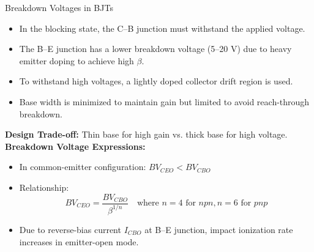 
\begin{frame}{Breakdown Voltages in BJTs}
\begin{itemize}
  \item In the blocking state, the C--B junction must withstand the applied voltage.
  \item The B--E junction has a lower breakdown voltage (5–20 V) due to heavy emitter doping to achieve high $\beta$.
  \item To withstand high voltages, a lightly doped collector drift region is used.
  \item Base width is minimized to maintain gain but limited to avoid reach-through breakdown.
\end{itemize}
\vspace{0.5em}
\textbf{Design Trade-off:} Thin base for high gain vs. thick base for high voltage.
\textbf{Breakdown Voltage Expressions:}
\begin{itemize}
  \item In common-emitter configuration: $BV_{CEO} < BV_{CBO}$
  \item Relationship:
  \[
  BV_{CEO} = \frac{BV_{CBO}}{\beta^{1/n}} \quad \text{where } n = 4 \text{ for } npn, n = 6 \text{ for } pnp
  \]
  \item Due to reverse-bias current $I_{CBO}$ at B--E junction, impact ionization rate increases in emitter-open mode.
\end{itemize}
\end{frame}


